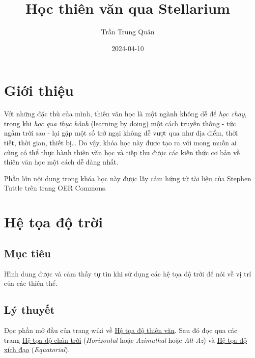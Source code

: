 \documentclass[
  a4paper,
]{book}
\title{Học thiên văn qua Stellarium}
\author{Trần Trung Quân}
\date{2024-04-10}
\begin{document}
\maketitle

{
\setcounter{tocdepth}{1}
\tableofcontents
}
\chapter*{Giới thiệu}\label{giux1edbi-thiux1ec7u}

Với những đặc thù của mình, thiên văn học là một ngành không dễ để \emph{học chay}, trong khi \emph{học qua thực hành} (learning by doing) một cách truyền thống - tức ngắm trời sao - lại gặp một số trở ngại không dễ vượt qua như địa điểm, thời tiết, thời gian, thiết bị\ldots{} Do vậy, khóa học này được tạo ra với mong muốn ai cũng có thể thực hành thiên văn học và tiếp thu được các kiến thức cơ bản về thiên văn học một cách dễ dàng nhất.

Phần lớn nội dung trong khóa học này được lấy cảm hứng từ tài liệu của Stephen Tuttle \citep{stuttle} trên trang OER Commons.

\chapter{Hệ tọa độ trời}\label{hux1ec7-tux1ecda-ux111ux1ed9-trux1eddi}

\section{Mục tiêu}\label{mux1ee5c-tiuxeau}

Hình dung được và cảm thấy tự tin khi sử dụng các hệ tọa độ trời để nói về vị trí của các thiên thể.

\section{Lý thuyết}\label{luxfd-thuyux1ebft}

Đọc phần mở đầu của trang wiki về
\href{https://vi.wikipedia.org/wiki/H\%E1\%BB\%87_t\%E1\%BB\%8Da_\%C4\%91\%E1\%BB\%99_thi\%C3\%AAn_v\%C4\%83n}{Hệ tọa độ thiên văn}.
Sau đó đọc qua các trang
\href{https://vi.wikipedia.org/wiki/H\%E1\%BB\%87_t\%E1\%BB\%8Da_\%C4\%91\%E1\%BB\%99_ch\%C3\%A2n_tr\%E1\%BB\%9Di}{Hệ tọa độ chân trời} (\emph{Horizontal} hoặc \emph{Azimuthal} hoặc \emph{Alt-Az})
và \href{https://vi.wikipedia.org/wiki/H\%E1\%BB\%87_t\%E1\%BB\%8Da_\%C4\%91\%E1\%BB\%99_x\%C3\%ADch_\%C4\%91\%E1\%BA\%A1o}{Hệ tọa độ xích đạo} (\emph{Equatorial}).
\end{document}
